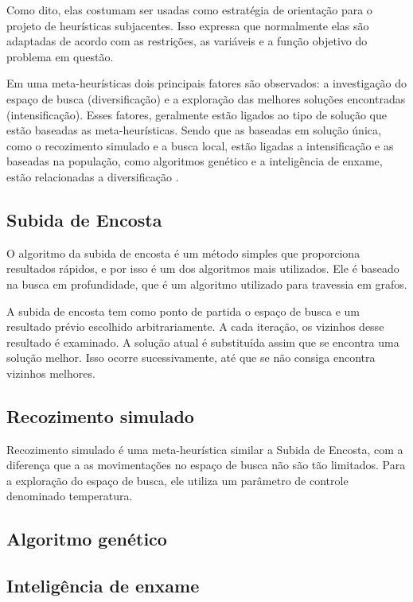 Como dito, elas costumam ser usadas como estratégia de orientação para o projeto de heurísticas subjacentes. Isso expressa que normalmente elas são adaptadas de acordo com as restrições, as variáveis e a função objetivo do problema em questão. 

Em uma meta-heurísticas dois principais fatores são observados: a investigação do espaço de busca (diversificação) e a exploração das melhores soluções encontradas (intensificação). Esses fatores, geralmente estão ligados ao tipo de solução que estão baseadas as meta-heurísticas. Sendo que as baseadas em solução única, como o recozimento simulado e a busca local, estão ligadas a intensificação e as baseadas na população, como algoritmos genético e a inteligência de enxame, estão relacionadas a diversificação \cite{talbi2009metaheuristics}.

\subsection{Subida de Encosta}

O algoritmo da subida de encosta é um método simples que proporciona resultados rápidos, e por isso é um dos algoritmos mais utilizados. Ele é baseado na busca em profundidade, que é um algoritmo utilizado para travessia em grafos. 

A subida de encosta tem como ponto de partida o espaço de busca e um resultado prévio escolhido arbitrariamente. A cada iteração, os vizinhos desse resultado é examinado. A solução atual é substituída assim que se encontra uma solução melhor. Isso ocorre sucessivamente, até que se não consiga encontra vizinhos melhores.  

\subsection{Recozimento simulado}

Recozimento simulado é uma meta-heurística similar a Subida de Encosta, com a diferença que a as movimentações no espaço de busca não são tão limitados. Para a exploração do espaço de busca, ele utiliza um parâmetro de controle denominado temperatura.

\subsection{Algoritmo genético}

\subsection{Inteligência de enxame}


